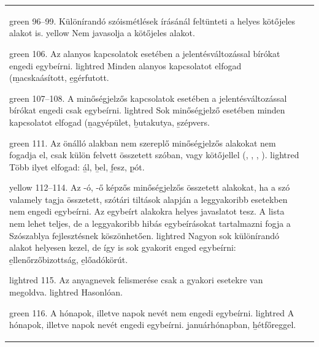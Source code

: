 \begin{longtable}[l]{p{7.8cm}p{7.8cm}}
\s
{green}
{96--99. Különírandó szóismétlések írásánál feltünteti a helyes kötőjeles
alakot is.
}
{yellow}
{Nem javasolja a kötőjeles alakot.
}

\s
{green}
{106. Az alanyos kapcsolatok esetében a jelentésváltozással bírókat
engedi egybeírni.
}
{lightred}
{Minden alanyos kapcsolatot elfogad (\b{macskaásított}, \b{egérfutott}.
}

\s
{green}
{107--108. A minőségjelzős kapcsolatok esetében a jelentésváltozással bírókat
engedi csak egybeírni.
}
{lightred}
{Sok minőségjelző esetében minden kapcsolatot elfogad (\b{nagyépület},
\b{butakutya}, \b{szépvers}.
}

\s
{green}
{111. Az önálló alakban nem szereplő minőségjelzős alakokat nem fogadja el,
csak külön felvett összetett szóban, vagy kötőjellel (\a{al-}, \a{ál-}, \a{bel-},
\a{fesz-}).
}
{lightred}
{Több ilyet elfogad: \b{ál}, \b{bel}, \b{fesz}, \b{pót}.
}

\s
{yellow}
{112--114. Az -ó, -ő képzős minőségjelzős összetett alakokat, ha a szó valamely
tagja összetett, szótári tiltások alapján a leggyakoribb esetekben nem engedi egybeírni.
Az egybeírt alakokra helyes javaslatot tesz. A lista nem lehet teljes,
de a leggyakoribb hibás egybeírásokat tartalmazni fogja a Szószablya fejlesztésnek
köszönhetően.
}
{lightred}
{Nagyon sok különírandó alakot helyesen kezel, de így is sok gyakorit enged
egybeírni: \b{ellenőrzőbizottság}, \b{előadókörút}.
}

\s
{lightred}
{115. Az anyagnevek felismerése csak a gyakori esetekre van megoldva.
}
{lightred}
{Hasonlóan.
}

\s
{green}
{116. A hónapok, illetve napok nevét nem engedi egybeírni.
}
{lightred}
{A hónapok, illetve napok nevét engedi egybeírni.
\b{januárhónapban}, \b{hétfőreggel}.
}


\end{longtable}




